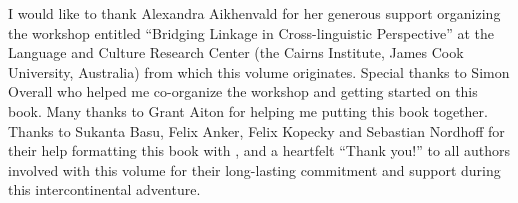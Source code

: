 \begin{refsection}

I would like to thank Alexandra Aikhenvald for her generous support organizing the workshop entitled ``Bridging Linkage in Cross-linguistic Perspective'' at the Language and Culture Research Center (the Cairns Institute, James Cook University, Australia) from which this volume originates. Special thanks to Simon Overall who helped me co-organize the workshop and getting started on this book. Many thanks to Grant Aiton for helping me putting this book together. Thanks to Sukanta Basu, Felix Anker, Felix Kopecky and Sebastian Nordhoff for their help formatting this book with \XeLaTeX, and a heartfelt ``Thank you!'' to all authors involved with this volume for their long-lasting commitment and support during this intercontinental adventure.

\printbibliography[heading=subbibliography]
\end{refsection}